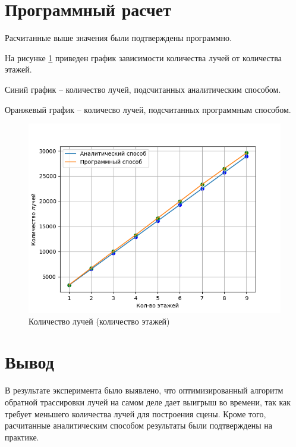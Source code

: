 \section{Программный расчет}
Расчитанные выше значения были подтверждены программно.

На рисунке \ref{img:e4} приведен график зависимости количества лучей от количества этажей.

Синий график -- количество лучей, подсчитанных аналитическим способом. 

Оранжевый график -- количесво лучей, подсчитанных программным способом.

\begin{figure}[H]
	\begin{center}
		\includegraphics[scale=0.80]{img/res/e4.png}
	\end{center}
	\captionsetup{justification=centering}
	\caption{Количество лучей (количество этажей)}
	\label{img:e4}
\end{figure}



\section{Вывод}

В результате эксперимента было выявлено, что оптимизированный алгоритм обратной трассировки лучей на самом деле дает выигрыш во времени, так как требует меньшего количества лучей для построения сцены. Кроме того, расчитанные аналитическим способом результаты были подтверждены на практике.

